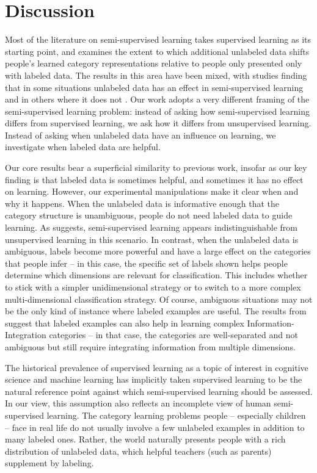 \documentclass[a4paper, doc]{apa6}
\begin{document}
\section{Discussion}

Most of the literature on semi-supervised learning takes supervised learning as its starting point, and examines the extent to which additional unlabeled data shifts people's learned category representations relative to people only presented only with labeled data. The results in this area have been mixed, with studies finding that in some situations unlabeled data has an effect in semi-supervised learning \cite{zhu2007humans, lake2011estimating, kalish2011can} and in others where it does not \cite{mcdonnell2012sparse}. Our work adopts a very different framing of the semi-supervised learning problem: instead of asking how semi-supervised learning differs from supervised learning, we ask how it differs from unsupervised learning. Instead of asking when unlabeled data have an influence on learning, we investigate when labeled data are helpful.

Our core results bear a superficial similarity to previous work, insofar as our key finding is that labeled data is sometimes helpful, and sometimes it has no effect on learning. However, our experimental manipulations make it clear when and why it happens. When the unlabeled data is informative enough that the category structure is unambiguous, people do not need labeled data to guide learning. As  suggests, semi-supervised learning appears indistinguishable from unsupervised learning in this scenario. In contrast, when the unlabeled data is ambiguous, labels become more powerful and have a large effect on the categories that people infer -- in this case, the specific set of labels shown helps people determine which dimensions are relevant for classification. This includes whether to stick with a simpler unidimensional strategy or to switch to a more complex multi-dimensional classification strategy. Of course, ambiguous situations may not be the only kind of instance where labeled examples are useful. The results from  suggest that labeled examples can also help in learning complex Information-Integration categories -- in that case, the categories are well-separated and not ambiguous but still require integrating information from multiple dimensions.

The historical prevalence of supervised learning as a topic of interest in cognitive science and machine learning has implicitly taken supervised learning to be the natural reference point against which semi-supervised learning should be assessed. In our view, this assumption also reflects an incomplete view of human semi-supervised learning. The category learning problems people -- especially children -- face in real life do not usually involve a few unlabeled examples in addition to many labeled ones. Rather, the world naturally presents people with a rich distribution of unlabeled data, which helpful teachers (such as parents) supplement by labeling.
\end{document}
